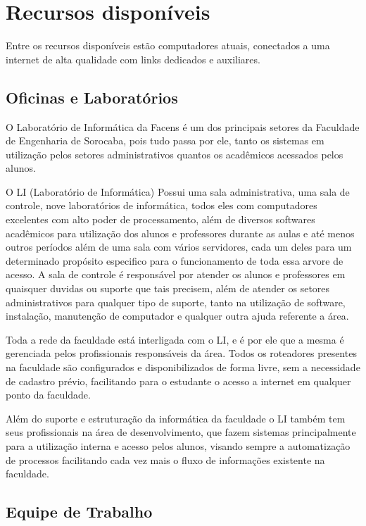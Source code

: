 \documentclass[
	12pt,				%
	oneside,			%
	a4paper,			%
	chapter=TITLE,		%
	section=TITLE,		%
	sumario=tradicional %
	english,			%
	french,				%
	spanish,			%
	brazil				%
	]{abntex2}
\begin{document}
\chapter{Recursos disponíveis}
\label{chap:chap4}
Entre os recursos disponíveis estão computadores atuais, conectados a uma internet de alta qualidade com links dedicados e auxiliares.

\section{Oficinas e Laboratórios}
\label{sec:oficlabs}
O Laboratório de Informática da Facens é um dos principais setores da Faculdade de Engenharia de Sorocaba, pois tudo passa por ele, tanto os sistemas em utilização pelos setores administrativos quantos os acadêmicos acessados pelos alunos.

O LI (Laboratório de Informática) Possui uma sala administrativa, uma sala de controle, nove laboratórios de informática, todos eles com computadores excelentes com alto poder de processamento, além de diversos softwares acadêmicos para utilização dos alunos e professores durante as aulas e até menos outros períodos além de uma sala com vários servidores, cada um deles para um determinado propósito especifico para o funcionamento de toda essa arvore de acesso. A sala de controle é responsável por atender os alunos e professores em quaisquer duvidas ou suporte que tais precisem, além de atender os setores administrativos para qualquer tipo de suporte, tanto na utilização de software, instalação, manutenção de computador e qualquer outra ajuda referente a área.

Toda a rede da faculdade está interligada com o LI, e é por ele que a mesma é gerenciada pelos profissionais responsáveis da área. Todos os roteadores presentes na faculdade são configurados e disponibilizados de forma livre, sem a necessidade de cadastro prévio, facilitando para o estudante o acesso a internet em qualquer ponto da faculdade.

Além do suporte e estruturação da informática da faculdade o LI também tem seus profissionais na área de desenvolvimento, que fazem sistemas principalmente para a utilização interna e acesso pelos alunos, visando sempre a automatização de processos facilitando cada vez mais o fluxo de informações existente na faculdade.

\section{Equipe de Trabalho}
\label{sec:equipetrabalho}
\end{document}
